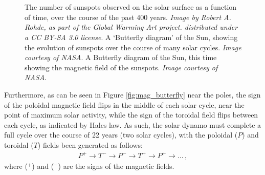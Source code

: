 \documentclass[11pt,a4paper,onecolumn]{report}
\begin{document}
\begin{figure}[t]%
  \centering
  \\%
  \\%
  \caption[]{ The number of sunspots observed on the
  solar surface as a function of time, over the course of the past 400 years.
  \textit{Image by Robert A. Rohde, as part of the Global Warming Art project.
  distributed under a CC BY-SA 3.0 license}.  A
  `Butterfly diagram' of the Sun, showing the evolution of sunspots over the
  course of many solar cycles. \textit{Image courtesy of NASA}.
   A Butterfly diagram of the Sun, this time showing
  the magnetic field of the sunspots. \textit{Image courtesy of NASA}. }
\end{figure}

Furthermore, as can be seen in Figure \ref{fig:mag_butterfly} near the poles,
the sign of the poloidal magnetic field flips in the middle of each solar cycle,
near the point of maximum solar activity, while the sign of the toroidal field
flips between each cycle, as indicated by Hales law. As such, the solar dynamo
must complete a full cycle over the course of 22 years (two solar cycles), with the
poloidal (\(P\)) and toroidal (\(T\)) fields been generated as follows:
\begin{align}
  P^+ \rightarrow T^- \rightarrow P^- \rightarrow T^+ \rightarrow P^+ \rightarrow \dotsc\,,
  \label{eqn:dynamo process}
\end{align}
where (\(^+\)) and (\( ^-\)) are the signs of the magnetic fields. \\
\end{document}
